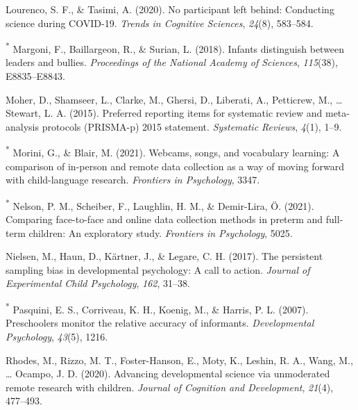 \documentclass[
  man,floatsintext]{apa6}
\newlength{\cslhangindent}
\newlength{\cslentryspacingunit} %
\newenvironment{CSLReferences}[2] %
 {%
  \setlength{\parindent}{0pt}
  \ifodd #1
  \let\oldpar\par
  \def\par{\hangindent=\cslhangindent\oldpar}
  \fi
  \setlength{\parskip}{#2\cslentryspacingunit}
 }%
 {}
\begin{document}
\begin{CSLReferences}{1}{0}
\leavevmode{}%
Lourenco, S. F., \& Tasimi, A. (2020). No participant left behind: Conducting science during COVID-19. \emph{Trends in Cognitive Sciences}, \emph{24}(8), 583--584.

\leavevmode{}%
\textsuperscript{*} Margoni, F., Baillargeon, R., \& Surian, L. (2018). Infants distinguish between leaders and bullies. \emph{Proceedings of the National Academy of Sciences}, \emph{115}(38), E8835--E8843.

\leavevmode{}%
Moher, D., Shamseer, L., Clarke, M., Ghersi, D., Liberati, A., Petticrew, M., \ldots{} Stewart, L. A. (2015). Preferred reporting items for systematic review and meta-analysis protocols (PRISMA-p) 2015 statement. \emph{Systematic Reviews}, \emph{4}(1), 1--9.

\leavevmode{}%
\textsuperscript{*} Morini, G., \& Blair, M. (2021). Webcams, songs, and vocabulary learning: A comparison of in-person and remote data collection as a way of moving forward with child-language research. \emph{Frontiers in Psychology}, 3347.

\leavevmode{}%
\textsuperscript{*} Nelson, P. M., Scheiber, F., Laughlin, H. M., \& Demir-Lira, Ö. (2021). Comparing face-to-face and online data collection methods in preterm and full-term children: An exploratory study. \emph{Frontiers in Psychology}, 5025.

\leavevmode{}%
Nielsen, M., Haun, D., Kärtner, J., \& Legare, C. H. (2017). The persistent sampling bias in developmental psychology: A call to action. \emph{Journal of Experimental Child Psychology}, \emph{162}, 31--38.

\leavevmode{}%
\textsuperscript{*} Pasquini, E. S., Corriveau, K. H., Koenig, M., \& Harris, P. L. (2007). Preschoolers monitor the relative accuracy of informants. \emph{Developmental Psychology}, \emph{43}(5), 1216.

\leavevmode{}%
Rhodes, M., Rizzo, M. T., Foster-Hanson, E., Moty, K., Leshin, R. A., Wang, M., \ldots{} Ocampo, J. D. (2020). Advancing developmental science via unmoderated remote research with children. \emph{Journal of Cognition and Development}, \emph{21}(4), 477--493.


\end{CSLReferences}
\end{document}
